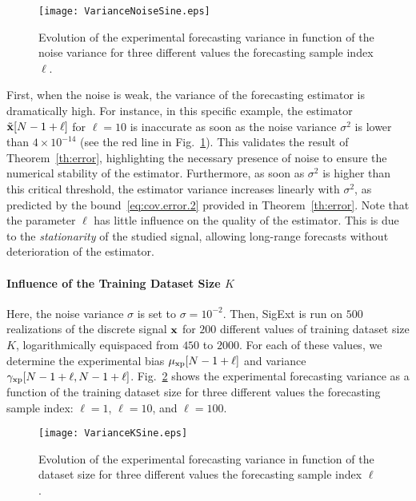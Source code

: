 \begin{figure}
\centering
\texttt{[image: VarianceNoiseSine.eps]}
\caption{Evolution of the experimental forecasting variance in function of the noise variance for three different values the forecasting sample index $\ell$.}
\label{fig:res.noise.sine}
\end{figure}

First, when the noise is weak, the variance of the forecasting estimator is dramatically high. For instance, in this specific example, the estimator $\tilde{{\mathbf x}}[N-1+\ell]$ for $\ell=10$ is inaccurate as soon as the noise variance $\sigma^2$ is lower than $4\times 10^{-14}$ (see the red line in Fig.~\ref{fig:res.noise.sine}). This validates the result of Theorem~\ref{th:error}, highlighting the necessary presence of noise to ensure the numerical stability of the estimator. Furthermore, as soon as $\sigma^2$ is higher than this critical threshold, the estimator variance increases linearly with $\sigma^2$, as predicted by the bound~\eqref{eq:cov.error.2} provided in Theorem~\ref{th:error}. Note that the parameter $\ell$ has little influence on the quality of the estimator. This is due to the \textit{stationarity} of the studied signal, allowing long-range forecasts without deterioration of the estimator.

\paragraph{Influence of the Training Dataset Size $K$} Here, the noise variance $\sigma$ is set to $\sigma=10^{-2}$. Then, {\sf SigExt} is run on $500$ realizations of the discrete signal ${\mathbf x}$ for $200$ different values of training dataset size $K$, logarithmically equispaced from $450$ to $2000$. For each of these values, we determine the experimental bias $\mu_{{\mathrm{xp}}}[N-1+\ell]$ and variance $\gamma_{{\mathrm{xp}}}[N-1+\ell,N-1+\ell]$. Fig.~\ref{fig:res.size.sine} shows the experimental forecasting variance as a function of the training dataset size for three different values the forecasting sample index: $\ell=1$, $\ell=10$, and $\ell=100$.

\begin{figure}
\texttt{[image: VarianceKSine.eps]}
\caption{Evolution of the experimental forecasting variance in function of the dataset size for three different values the forecasting sample index $\ell$.}
\label{fig:res.size.sine}
\end{figure}

